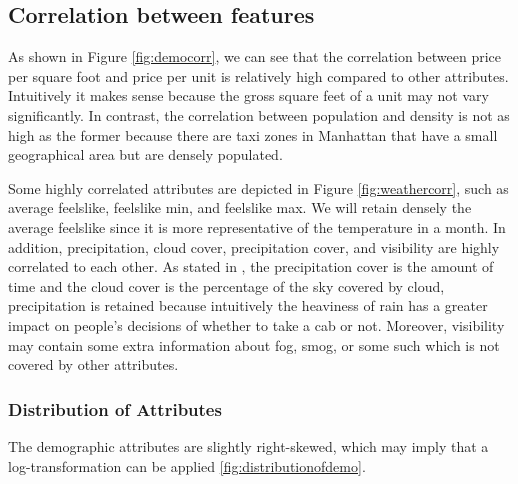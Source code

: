 \documentclass[11pt]{article}
\begin{document}
\subsection{Correlation between features}
As shown in Figure \ref{fig:democorr}, we can see that the correlation between price per square foot and price per unit is relatively high compared to other attributes. Intuitively it makes sense because the gross square feet of a unit may not vary significantly. In contrast, the correlation between population and density is not as high as the former because there are taxi zones in Manhattan that have a small geographical area but are densely populated. 

Some highly correlated attributes are depicted in Figure \ref{fig:weathercorr}, such as average feelslike, feelslike min, and feelslike max. We will retain densely the average feelslike since it is more representative of the temperature in a month. In addition, precipitation, cloud cover, precipitation cover, and visibility are highly correlated to each other. As stated in \cite{weathermetadata}, the precipitation cover is the amount of time and the cloud cover is the percentage of the sky covered by cloud, precipitation is retained because intuitively the heaviness of rain has a greater impact on people's decisions of whether to take a cab or not. Moreover, visibility may contain some extra information about fog, smog, or some such which is not covered by other attributes. 
\subsubsection{Distribution of Attributes}
The demographic attributes are slightly right-skewed, which may imply that a log-transformation can be applied \ref{fig:distributionofdemo}.
\end{document}

